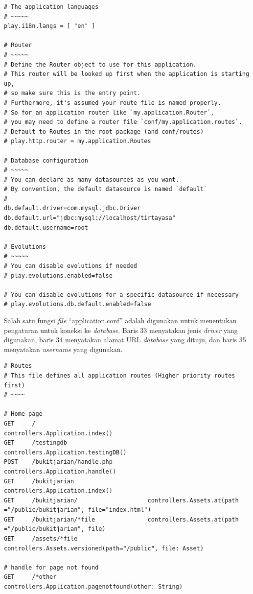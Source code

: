 \documentclass[a4paper,twoside]{article}
\begin{document}
\begin{enumerate}
\begin{lstlisting}[caption=application.conf,label={lst:application.conf}]
# The application languages
# ~~~~~
play.i18n.langs = [ "en" ]

# Router
# ~~~~~
# Define the Router object to use for this application.
# This router will be looked up first when the application is starting up,
# so make sure this is the entry point.
# Furthermore, it's assumed your route file is named properly.
# So for an application router like `my.application.Router`,
# you may need to define a router file `conf/my.application.routes`.
# Default to Routes in the root package (and conf/routes)
# play.http.router = my.application.Routes

# Database configuration
# ~~~~~
# You can declare as many datasources as you want.
# By convention, the default datasource is named `default`
#
db.default.driver=com.mysql.jdbc.Driver
db.default.url="jdbc:mysql://localhost/tirtayasa"
db.default.username=root

# Evolutions
# ~~~~~
# You can disable evolutions if needed
# play.evolutions.enabled=false

# You can disable evolutions for a specific datasource if necessary
# play.evolutions.db.default.enabled=false
\end{lstlisting}

Salah satu fungsi \textit{file} ``application.conf'' adalah digunakan untuk menentukan pengaturan untuk koneksi ke \textit{database}. Baris 33 menyatakan jenis \textit{driver} yang digunakan, baris 34 menyatakan alamat URL \textit{database} yang dituju, dan baris 35 menyatakan \textit{username} yang digunakan.

\begin{lstlisting}[caption=routes,label={lst:routes}]
# Routes
# This file defines all application routes (Higher priority routes first)
# ~~~~

# Home page
GET		/	 		 					 controllers.Application.index()
GET		/testingdb	 					 controllers.Application.testingDB()
POST	/bukitjarian/handle.php	 		 controllers.Application.handle()
GET     /bukitjarian		             controllers.Application.index()
GET     /bukitjarian/		             controllers.Assets.at(path ="/public/bukitjarian", file="index.html")
GET     /bukitjarian/*file         		 controllers.Assets.at(path ="/public/bukitjarian", file)
GET     /assets/*file               	 controllers.Assets.versioned(path="/public", file: Asset)

# handle for page not found
GET     /*other	         		 	     controllers.Application.pagenotfound(other: String)
\end{lstlisting}


\end{enumerate}
\end{document}
